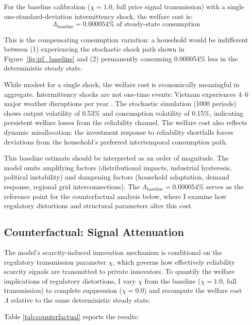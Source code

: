 \documentclass[12pt, a4paper]{article}
\begin{document}
For the baseline calibration ($\chi = 1.0$, full price signal transmission) with a single one-standard-deviation intermittency shock, the welfare cost is:
\begin{equation*}
\Lambda_{\text{baseline}} = 0.000054\% \text{ of steady-state consumption}
\end{equation*}

\noindent This is the compensating consumption variation: a household would be indifferent between (1) experiencing the stochastic shock path shown in Figure~\ref{fig:irf_baseline} and (2) permanently consuming 0.000054\% less in the deterministic steady state.

While modest for a single shock, the welfare cost is economically meaningful in aggregate. Intermittency shocks are not one-time events: Vietnam experiences 4--6 major weather disruptions per year \citep{nguyenle2019}. The stochastic simulation (1000 periods) shows output volatility of 0.53\% and consumption volatility of 0.15\%, indicating persistent welfare losses from the reliability channel. The welfare cost also reflects dynamic misallocation: the investment response to reliability shortfalls forces deviations from the household's preferred intertemporal consumption path.

This baseline estimate should be interpreted as an order of magnitude. The model omits amplifying factors (distributional impacts, industrial hysteresis, political instability) and dampening factors (household adaptation, demand response, regional grid interconnections). The $\Lambda_{\text{baseline}} = 0.000054\%$ serves as the reference point for the counterfactual analysis below, where I examine how regulatory distortions and structural parameters alter this cost.

\subsection{Counterfactual: Signal Attenuation}

The model's scarcity-induced innovation mechanism is conditional on the regulatory transmission parameter $\chi$, which governs how effectively reliability scarcity signals are transmitted to private innovators. To quantify the welfare implications of regulatory distortions, I vary $\chi$ from the baseline ($\chi = 1.0$, full transmission) to complete suppression ($\chi = 0.0$) and recompute the welfare cost $\Lambda$ relative to the same deterministic steady state.

Table \ref{tab:counterfactual} reports the results:
\end{document}
